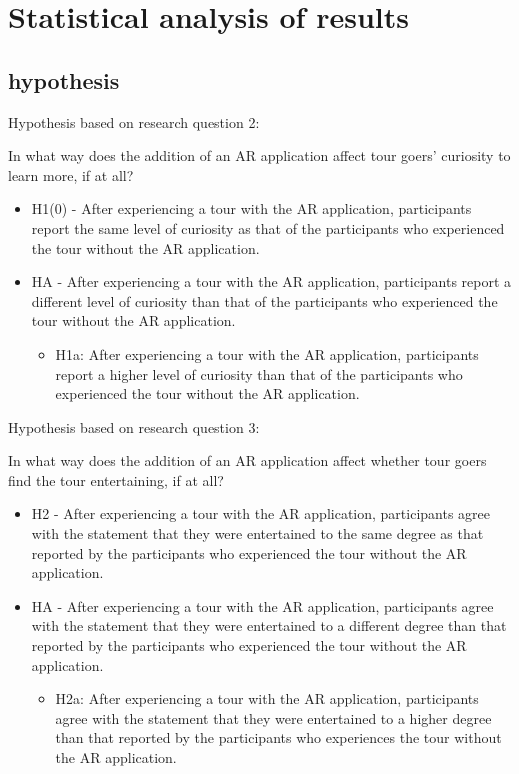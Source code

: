 \section{Statistical analysis of results} 
\subsection{hypothesis}
Hypothesis based on research question 2:

In what way does the addition of an AR application affect tour goers’ curiosity to learn more, if at all?

\begin{itemize}
\item H1(0) - After experiencing a tour with the AR application, participants report the same level of curiosity as that of the participants who experienced the tour without the AR application. 
\item HA - After experiencing a tour with the AR application, participants report a different level of curiosity than that of the participants who experienced the tour without the AR application. 
\begin{itemize}
\item H1a: After experiencing a tour with the AR application, participants report a higher level of curiosity than that of the participants who experienced the tour without the AR application.
\end{itemize}
\end{itemize}

Hypothesis based on research question 3:

In what way does the addition of an AR application affect whether tour goers find the tour entertaining, if at all?

\begin{itemize}
\item H2 - After experiencing a tour with the AR application, participants agree with the statement that they were entertained to the same degree as that reported by the participants who experienced the tour without the AR application. 
\item HA - After experiencing a tour with the AR application, participants agree with the statement that they were entertained to a different degree than that reported by the participants who experienced the tour without the AR application. 
\begin{itemize}
\item H2a: After experiencing a tour with the AR application, participants agree with the statement that they were entertained to a higher degree than that reported by the participants who experiences the tour without the AR application. 
\end{itemize}
\end{itemize}

